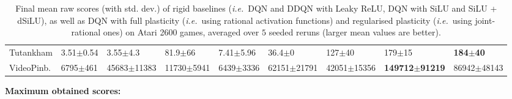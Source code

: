 \documentclass[accepted]{article}
\theoremstyle{plain}
\theoremstyle{definition}
\theoremstyle{remark}
\newcommand{\ie}{\emph{i.e.}~}
\begin{document}
\begin{table}[H]
{\begin{tabular}{@{}lllllllll@{}}
\multicolumn{1}{l|}{Tutankham}  & \multicolumn{1}{l|}{3.51\tiny$\pm$0.54} & 3.55\tiny$\pm$4.3         & 81.9\tiny$\pm$66         & \multicolumn{1}{l|}{7.41\tiny$\pm$5.96}   & \multicolumn{1}{l|}{36.4\tiny$\pm$0}      & 127\tiny$\pm$40          & 179\tiny$\pm$15                & \textbf{184\tiny$\pm$40}        \\
\multicolumn{1}{l|}{VideoPinb.}                      & \multicolumn{1}{l|}{6795\tiny$\pm$461}                       & 45683\tiny$\pm$11383      & 11730\tiny$\pm$5941      & \multicolumn{1}{l|}{6439\tiny$\pm$3336}                        & \multicolumn{1}{l|}{62151\tiny$\pm$21791}                      & 42051\tiny$\pm$15356     & \textbf{149712\tiny$\pm$91219} & 86942\tiny$\pm$48143            \\ \bottomrule
\end{tabular}
}
\caption{Final mean raw scores (with std. dev.) of rigid baselines (\ie DQN and DDQN with Leaky ReLU, DQN with SiLU and SiLU + dSiLU), as well as DQN with full plasticity (\ie using rational activation functions) and regularised plasticity (\ie using joint-rational ones) on Atari 2600 games, averaged over $5$ seeded reruns (larger mean values are better).}
\label{app:all_scores}
\end{table}

\textbf{Maximum obtained scores:}
\end{document}
